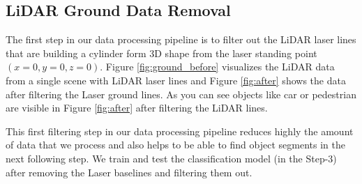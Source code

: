 %
%
%


\subsection{LiDAR Ground Data Removal}
The first step in our data processing pipeline is to filter out the LiDAR laser lines that are building a cylinder 
form 3D shape from the laser standing point $(x=0, y=0, z=0)$. Figure \ref{fig:ground_before} visualizes the LiDAR 
data from a single scene with LiDAR laser lines and Figure \ref{fig:after} shows the data after filtering the Laser ground lines. 
As you can see objects like car or pedestrian are visible in Figure \ref{fig:after} after filtering the LiDAR lines.

This first filtering step in our data processing pipeline reduces highly the amount of data that we process and 
also helps to be able to find object segments in the next following step.
We train and test the classification model (in the Step-3) after removing the Laser baselines and filtering them out.



